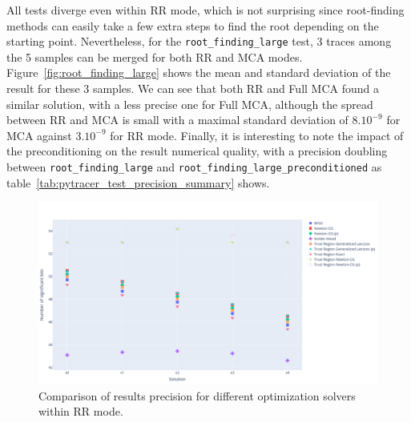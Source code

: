 \documentclass[11pt]{article}
\begin{document}
All tests diverge even within RR mode, which is not surprising since root-finding methods can easily take a few extra steps to find the root depending on the starting point. Nevertheless, for the \texttt{root\_finding\_large} test, 3 traces among the 5 samples can be merged for both RR and MCA modes.
Figure~\ref{fig:root_finding_large} shows the mean and standard deviation of the result for these 3 samples. We can see that both RR and Full MCA found a similar solution, with a less precise one for Full MCA, although the spread between RR and MCA is small with a maximal standard deviation of $8.10^{-9}$ for MCA against $3.10^{-9}$ for RR mode. Finally, it is interesting to note the impact of the preconditioning on the result numerical quality, with a precision doubling between \texttt{root\_finding\_large} and \texttt{root\_finding\_large\_preconditioned} as table~\ref{tab:pytracer_test_precision_summary} shows.

\begin{figure}
    \centering
    \includegraphics[width=\linewidth]{figure/unconstrained_optimization_comparison.png}
    \caption{Comparison of results precision for different optimization solvers within RR mode.}
    \label{fig:unconstrained_optimization}
\end{figure}
\end{document}
